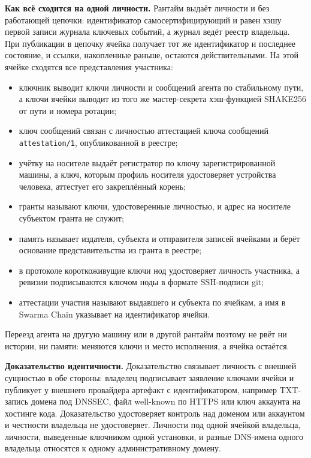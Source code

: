 \documentclass[10pt,a4paper]{article}
\begin{document}
\textbf{Как всё сходится на одной личности.} Рантайм выдаёт личности и без работающей цепочки: идентификатор самосертифицирующий и равен хэшу первой записи журнала ключевых событий, а журнал ведёт реестр владельца. При публикации в цепочку ячейка получает тот же идентификатор и последнее состояние, и ссылки, накопленные раньше, остаются действительными. На этой ячейке сходятся все представления участника:
\begin{itemize}
\item ключник выводит ключи личности и сообщений агента по стабильному пути, а ключи ячейки выводит из того же мастер-секрета хэш-функцией SHAKE256 от пути и номера ротации;
\item ключ сообщений связан с личностью аттестацией ключа сообщений \texttt{attestation/1}, опубликованной в реестре;
\item учётку на носителе выдаёт регистратор по ключу зарегистрированной машины, а ключ, которым профиль носителя удостоверяет устройства человека, аттестует его закреплённый корень;
\item гранты называют ключи, удостоверенные личностью, и адрес на носителе субъектом гранта не служит;
\item память называет издателя, субъекта и отправителя записей ячейками и берёт основание представительства из гранта в реестре;
\item в протоколе короткоживущие ключи нод удостоверяет личность участника, а ревизии подписываются ключом ноды в формате SSH-подписи git;
\item аттестации участия называют выдавшего и субъекта по ячейкам, а имя в Swarma Chain указывает на идентификатор ячейки.
\end{itemize}
Переезд агента на другую машину или в другой рантайм поэтому не рвёт ни истории, ни памяти: меняются ключи и место исполнения, а ячейка остаётся.

\textbf{Доказательство идентичности.} Доказательство связывает личность с внешней сущностью в обе стороны: владелец подписывает заявление ключами ячейки и публикует у внешнего провайдера артефакт с идентификатором, например TXT-запись домена под DNSSEC, файл well-known по HTTPS или ключ аккаунта на хостинге кода. Доказательство удостоверяет контроль над доменом или аккаунтом и честности владельца не удостоверяет. Личности под одной ячейкой владельца, личности, выведенные ключником одной установки, и разные DNS-имена одного владельца относятся к одному административному домену.
\end{document}

